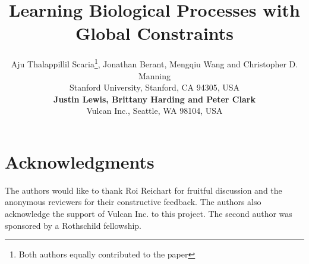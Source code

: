 \documentclass[11pt,letterpaper]{article}
\title{Learning Biological Processes with Global Constraints}
\author{\small{Aju Thalappillil Scaria\thanks{\hspace{5pt}Both authors equally contributed to the paper}, Jonathan Berant\samethanks, Mengqiu Wang and Christopher D. Manning}  \\
 			\small{Stanford University, Stanford, CA 94305, USA} \\ 
			\small{\textbf{Justin Lewis, Brittany Harding and Peter Clark}} \\
			\small{Vulcan Inc., Seattle, WA 98104, USA} \\
}
\begin{document}
\maketitle

 
 \label{sec:intro}
 \label{sec:process}
 \label{sec:model}
 \label{sec:experiment}
 \label{sec:related}
 \label{sec:conclusion}

\section*{Acknowledgments}
The authors would like to thank Roi Reichart for fruitful discussion and 
the anonymous reviewers for their constructive feedback.
The authors also acknowledge the support of Vulcan Inc. to this project.
The second author was sponsored by a Rothschild fellowship. 



\end{document}
